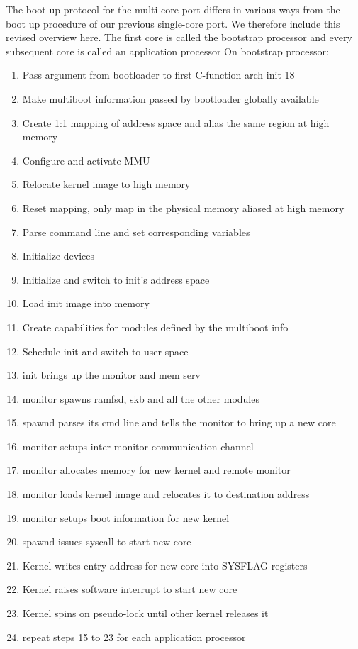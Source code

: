 \documentclass[a4paper,twoside]{report} %
\begin{document}

The boot up protocol for the multi-core port differs in various ways
from the boot up procedure of our previous single-core port. We
therefore include this revised overview here. The first core is called
the bootstrap processor and every subsequent core is called an
application processor On bootstrap processor:

\begin{enumerate}
\item Pass argument from bootloader to first C-function arch
  init 18
\item Make multiboot information passed by bootloader globally
  available
\item Create 1:1 mapping of address space and alias the same region at
  high memory
\item Configure and activate MMU
\item Relocate kernel image to high memory
\item Reset mapping, only map in the physical memory aliased at high
  memory
\item Parse command line and set corresponding variables
\item Initialize devices
\item Initialize and switch to init’s address space
\item Load init image into memory
\item Create capabilities for modules defined by the multiboot info
\item Schedule init and switch to user space
\item init brings up the monitor and mem serv
\item monitor spawns ramfsd, skb and all the other modules
\item spawnd parses its cmd line and tells the monitor to bring up a
  new core
\item monitor setups inter-monitor communication channel
\item monitor allocates memory for new kernel and remote monitor
\item monitor loads kernel image and relocates it to destination
  address
\item monitor setups boot information for new kernel
\item spawnd issues syscall to start new core
\item Kernel writes entry address for new core into SYSFLAG registers
\item Kernel raises software interrupt to start new core
\item Kernel spins on pseudo-lock until other kernel releases it
\item repeat steps 15 to 23 for each application processor
\end{enumerate}
\end{document}
